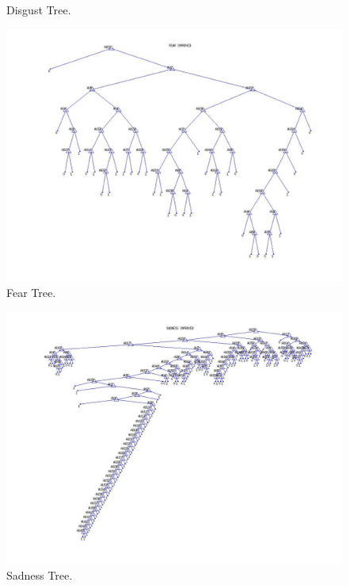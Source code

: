 \documentclass[a4paper,12pt,oneside,final]{report}
\newenvironment{changemargin}[2]{\begin{list}{}{%
\setlength{\topsep}{0pt}%
\setlength{\leftmargin}{0pt}%
\setlength{\rightmargin}{0pt}%
\setlength{\listparindent}{\parindent}%
\setlength{\itemindent}{\parindent}%
\setlength{\parsep}{0pt plus 1pt}%
\addtolength{\leftmargin}{#1}%
\addtolength{\rightmargin}{#2}%
}\item }{\end{list}}
\begin{document}
\begin{appendices}
\begin{figure}[!h]
\begin{changemargin}{-20mm}{-20mm}
\center
\caption{Disgust Tree.}
\end{changemargin}
\end{figure}

\begin{figure}[!h]
\begin{changemargin}{-25mm}{-25mm}
\center
\includegraphics[scale=0.5]{fear_improved.jpg}
\caption{Fear Tree.}
\end{changemargin}
\end{figure}


\begin{figure}[!h]
\begin{changemargin}{-25mm}{-25mm}
\center
\includegraphics[scale=0.5]{sadness_improved.jpg}
\caption{Sadness Tree.}
\end{changemargin}
\end{figure}


\end{appendices}
\end{document}
